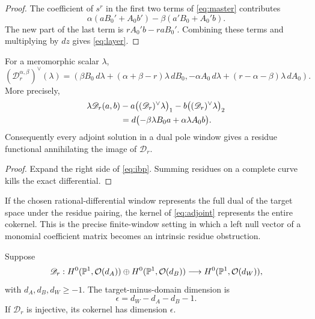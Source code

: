 \documentclass[11pt,reqno]{amsart}
\begin{document}
\begin{proof}
The coefficient of \(s^r\) in the first two terms of
\eqref{eq:master} contributes
\[
\alpha(aB_0'+A_0b')-\beta(a'B_0+A_0'b).
\]
The new part of the last term is \(rA_0'b-raB_0'\).  Combining these
terms and multiplying by \(dz\) gives \eqref{eq:layer}.
\end{proof}

\begin{proposition}
\label{prop:adjoint}
For a meromorphic scalar \(\lambda\),
\begin{equation}
\label{eq:adjoint}
\boxed{
(\mathscr D_r^{\alpha,\beta})^\vee(\lambda)
=\left(
\beta B_0\,d\lambda+(\alpha+\beta-r)\lambda\,dB_0,
-\alpha A_0\,d\lambda+(r-\alpha-\beta)\lambda\,dA_0
\right).}
\end{equation}
More precisely,
\begin{align}
\lambda\mathscr D_r(a,b)
&-a\bigl((\mathscr D_r)^\vee\lambda\bigr)_1
-b\bigl((\mathscr D_r)^\vee\lambda\bigr)_2\notag\\
&=d\bigl(-\beta\lambda B_0a+\alpha\lambda A_0b\bigr).
\label{eq:ibp}
\end{align}
Consequently every adjoint solution in a dual pole window gives a residue
functional annihilating the image of \(\mathscr D_r\).
\end{proposition}

\begin{proof}
Expand the right side of \eqref{eq:ibp}.  Summing residues on a complete
curve kills the exact differential.
\end{proof}

If the chosen rational-differential window represents the full dual of the
target space under the residue pairing, the kernel of
\eqref{eq:adjoint} represents the entire cokernel.  This is the precise
finite-window setting in which a left null vector of a monomial coefficient
matrix becomes an intrinsic residue obstruction.

\begin{proposition}
\label{prop:index}
Suppose
\[
\mathscr D_r:
H^0(\mathbb P^1,\mathcal O(d_A))\oplus
H^0(\mathbb P^1,\mathcal O(d_B))
\longrightarrow
H^0(\mathbb P^1,\mathcal O(d_W)),
\]
with \(d_A,d_B,d_W\ge-1\).  The target-minus-domain dimension is
\begin{equation}
\label{eq:index}
\epsilon=d_W-d_A-d_B-1.
\end{equation}
If \(\mathscr D_r\) is injective, its cokernel has dimension \(\epsilon\).
\end{proposition}
\end{document}
